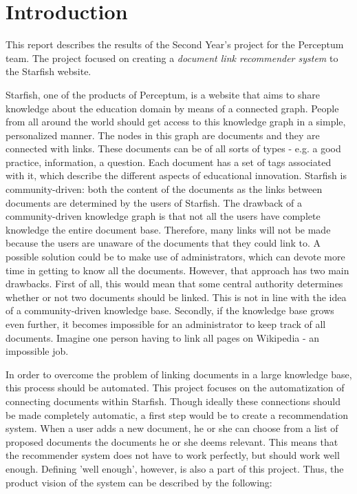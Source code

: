 

\section{Introduction}

This report describes the results of the Second Year's project for the Perceptum team. The project focused on creating a \emph{document link recommender system} to the Starfish website. 

Starfish, one of the products of Perceptum, is a website that aims to share knowledge about the education domain by means of a connected graph. People from all around the world should get access to this knowledge graph in a simple, personalized manner. The nodes in this graph are documents and they are connected with links. These documents can be of all sorts of types - e.g. a good practice, information, a question. Each document has a set of tags associated with it, which describe the different aspects of educational innovation. Starfish is community-driven: both the content of the documents as the links between documents are determined by the users of Starfish. The drawback of a community-driven knowledge graph is that not all the users have complete knowledge the entire document base. Therefore, many links will not be made because the users are unaware of the documents that they could link to. A possible solution could be to make use of administrators, which can devote more time in getting to know all the documents. However, that approach has two main drawbacks. First of all, this would mean that some central authority determines whether or not two documents should be linked. This is not in line with the idea of a community-driven knowledge base. Secondly, if the knowledge base grows even further, it becomes impossible for an administrator to keep track of all documents. Imagine one person having to link all pages on Wikipedia - an impossible job. 

In order to overcome the problem of linking documents in a large knowledge base, this process should be automated. This project focuses on the automatization of connecting documents within Starfish. Though ideally these connections should be made completely automatic, a first step would be to create a recommendation system. When a user adds a new document, he or she can choose from a list of proposed documents the documents he or she deems relevant. This means that the recommender system does not have to work perfectly, but should work well enough. Defining 'well enough', however, is also a part of this project. Thus, the product vision of the system can be described by the following:

